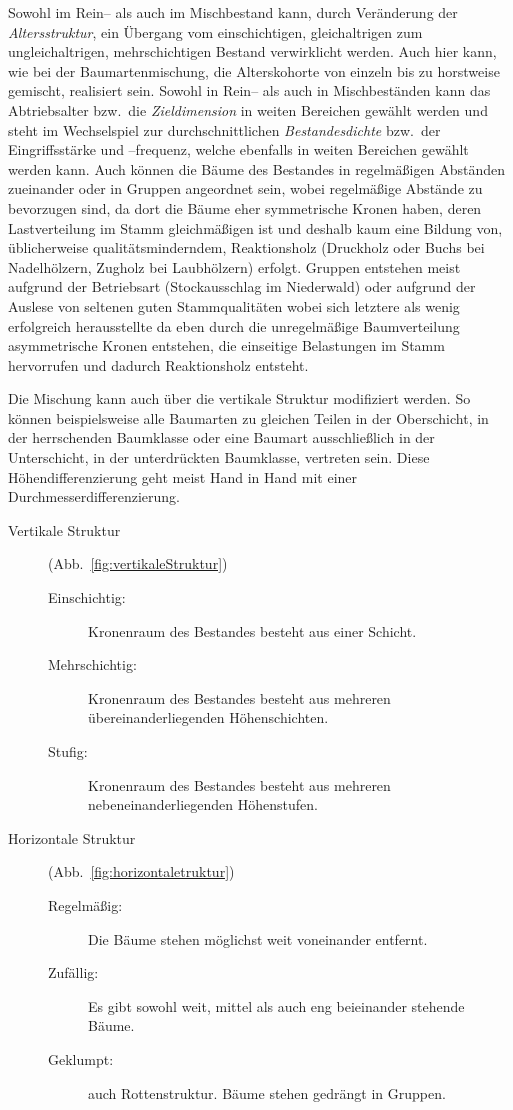 \documentclass[twocolumn]{scrartcl}
\begin{document}
Sowohl im Rein-- als auch im Mischbestand kann, durch Veränderung der
\emph{Altersstruktur}, ein Übergang vom einschichtigen, gleichaltrigen zum
ungleichaltrigen, mehrschichtigen Bestand verwirklicht werden. Auch hier kann,
wie bei der Baumartenmischung, die Alterskohorte von einzeln bis zu horstweise
gemischt, realisiert sein. Sowohl in Rein-- als auch in Mischbeständen kann das
Abtriebsalter bzw.\ die \emph{Zieldimension} in weiten Bereichen gewählt werden
und steht im Wechselspiel zur durchschnittlichen \emph{Bestandesdichte} bzw.\
der Eingriffsstärke und --frequenz, welche ebenfalls in weiten Bereichen gewählt
werden kann. Auch können die Bäume des Bestandes in regelmäßigen Abständen
zueinander oder in Gruppen angeordnet sein, wobei regelmäßige Abstände zu
bevorzugen sind, da dort die Bäume eher symmetrische Kronen haben, deren
Lastverteilung im Stamm gleichmäßigen ist und deshalb kaum eine Bildung von,
üblicherweise qualitätsminderndem, Reaktionsholz (Druckholz oder Buchs bei
Nadelhölzern, Zugholz bei Laubhölzern) erfolgt. Gruppen entstehen meist aufgrund
der Betriebsart (Stockausschlag im Niederwald) oder aufgrund der Auslese von
seltenen guten Stammqualitäten
\citep{kato1969Buchendurchforstung,kato1988Gruppendurchforstung} wobei sich
letztere als wenig erfolgreich herausstellte da eben durch die unregelmäßige
Baumverteilung asymmetrische Kronen entstehen, die einseitige Belastungen im
Stamm hervorrufen und dadurch Reaktionsholz entsteht.

Die Mischung kann auch über die vertikale Struktur modifiziert
werden. So können beispielsweise alle Baumarten zu gleichen Teilen in
der Oberschicht, in der herrschenden Baumklasse oder eine Baumart
ausschließlich in der Unterschicht, in der unterdrückten Baumklasse,
vertreten sein. Diese Höhendifferenzierung geht meist Hand in Hand mit
einer Durchmesserdifferenzierung.

\begin{description}
\item[Vertikale Struktur] (Abb.~\ref{fig:vertikaleStruktur})
  \begin{description}
  \item[Einschichtig:] Kronenraum des Bestandes besteht aus einer Schicht.
  \item[Mehrschichtig:] Kronenraum des Bestandes besteht aus mehreren übereinanderliegenden Höhenschichten.
  \item[Stufig:] Kronenraum des Bestandes besteht aus mehreren nebeneinanderliegenden Höhenstufen.
  \end{description}
\item[Horizontale Struktur] (Abb.~\ref{fig:horizontaletruktur})
  \begin{description}
  \item[Regelmäßig:] Die Bäume stehen möglichst weit voneinander entfernt.
  \item[Zufällig:] Es gibt sowohl weit, mittel als auch eng beieinander stehende Bäume.
  \item[Geklumpt:] auch Rottenstruktur. Bäume stehen gedrängt in Gruppen.
  \end{description}
\end{description}
\end{document}
